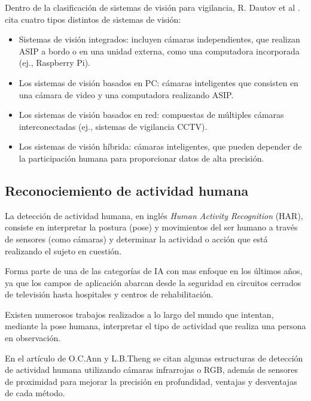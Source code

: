 \documentclass[a4paper,12pt,oneside,spanish]{book}
\begin{document}
Dentro de la clasificación de sistemas de visión para vigilancia, R. Dautov et al \cite{dautov}. cita cuatro tipos distintos de sistemas de visión:
\begin{itemize}
	\item Sistemas de visión integrados: incluyen cámaras independientes, que realizan ASIP a bordo o en una unidad externa, como una computadora incorporada (ej., Raspberry Pi).\\	
	\item Los sistemas de visión basados en PC: cámaras inteligentes que consisten en una cámara de video y una computadora  realizando ASIP.\\	
	\item Los sistemas de visión basados en red: compuestas de múltiples cámaras interconectadas (ej., sistemas de vigilancia CCTV).\\	
	\item Los sistemas de visión híbrida: cámaras inteligentes, que pueden depender de la participación humana para proporcionar datos de alta precisión.\\	
\end{itemize}

\subsection{Reconociemiento de actividad humana}

La detección de actividad humana, en inglés \textit{Human Activity Recognition} (HAR), consiste en interpretar la postura (pose) y movimientos del ser humano a través de sensores (como cámaras) y determinar la actividad o acción que está realizando el sujeto en cuestión.\par

Forma parte de una de las categorías de IA con mas enfoque en los últimos años, ya que los campos de aplicación abarcan desde la seguridad en circuitos cerrados de televisión hasta hospitales y centros de rehabilitación.\par

Existen numerosos trabajos realizados a lo largo del mundo que intentan, mediante la pose humana, interpretar el tipo de actividad que realiza una persona en observación. \par

En el artículo de O.C.Ann y L.B.Theng \cite{activity1} se citan algunas estructuras de detección de actividad humana utilizando cámaras infrarrojas o RGB, además de sensores de proximidad para mejorar la precisión en profundidad, ventajas y desventajas de cada método.\par
\end{document}

